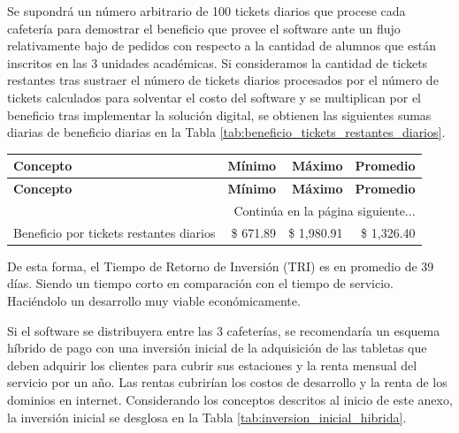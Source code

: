 Se supondrá un número arbitrario de 100 tickets diarios que procese cada cafetería para demostrar el beneficio que provee el software ante un flujo relativamente bajo de pedidos con respecto a la cantidad de alumnos que están inscritos en las 3 unidades académicas. Si consideramos la cantidad de tickets restantes tras sustraer el número de tickets diarios procesados por el número de tickets calculados para solventar el costo del software y se multiplican por el beneficio tras implementar la solución digital, se obtienen las siguientes sumas diarias de beneficio diarias en la Tabla \ref{tab:beneficio_tickets_restantes_diarios}.

\begingroup
\setlength{\LTleft}{\fill}
\setlength{\LTright}{\fill}

\begin{tabularx}{\textwidth}{X r r r}
\caption{Beneficio por tickets restantes diarios.} \label{tab:beneficio_tickets_restantes_diarios}\\
\toprule
\textbf{Concepto} & \textbf{Mínimo} & \textbf{Máximo} & \textbf{Promedio} \\
\midrule
\endfirsthead

\toprule
\textbf{Concepto} & \textbf{Mínimo} & \textbf{Máximo} & \textbf{Promedio} \\
\midrule
\endhead

\midrule
\multicolumn{4}{r}{\small Continúa en la página siguiente...} \\
\endfoot
\bottomrule
\endlastfoot

Beneficio por tickets restantes diarios & \$ 671.89 & \$ 1,980.91 & \$ 1,326.40 \\
\end{tabularx}
\endgroup

De esta forma, el Tiempo de Retorno de Inversión (TRI) es en promedio de 39 días. Siendo un tiempo corto en comparación con el tiempo de servicio. Haciéndolo un desarrollo muy viable económicamente.

Si el software se distribuyera entre las 3 cafeterías, se recomendaría un esquema híbrido de pago con una inversión inicial de la adquisición de las tabletas que deben adquirir los clientes para cubrir sus estaciones y la renta mensual del servicio por un año. Las rentas cubrirían los costos de desarrollo y la renta de los dominios en internet. Considerando los conceptos descritos al inicio de este anexo, la inversión inicial se desglosa en la Tabla \ref{tab:inversion_inicial_hibrida}.

\begingroup
\setlength{\LTleft}{\fill}
\setlength{\LTright}{\fill}

